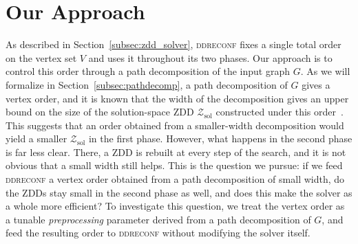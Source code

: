\documentclass[conference]{IEEEtran}
\newcommand{\zsol}{\mathcal{Z}_{\mathrm{sol}}}
\newcommand{\OrigDecom}{\textsf{orig}\xspace}
\newcommand{\HeurDecom}{\textsf{gree}\xspace}
\newcommand{\OptDecom}{\textsf{opt}\xspace}
\begin{document}
\section{Our Approach}
\label{sec:approach}
As described in Section~\ref{subsec:zdd_solver}, \textsc{ddreconf} fixes a single
total order on the vertex set $V$ and uses it throughout its two phases. Our approach is to
control this order through a path decomposition of the input graph $G$. 
As we will formalize in Section~\ref{subsec:pathdecomp}, a path decomposition of $G$
gives a vertex order, and it is known that the width of the decomposition gives an
upper bound on the size of the solution-space ZDD $\zsol$ constructed under this
order~\cite{inoue16}. This suggests that an order obtained from a smaller-width decomposition would yield a smaller $\zsol$ in the first phase.
However, what happens in the
second phase is far less clear. There, a ZDD is rebuilt at every step of the
search, and it is not obvious that a small width still helps. This is the
question we pursue: if we feed \textsc{ddreconf} a vertex order obtained from a
path decomposition of small width, do the ZDDs stay small in the second phase
as well, and does this make the solver as a whole more efficient? 
To investigate this question, we treat the vertex order as a tunable
\emph{preprocessing} parameter derived from a path decomposition of $G$, and feed
the resulting order to \textsc{ddreconf} without modifying the solver itself.

\end{document}
